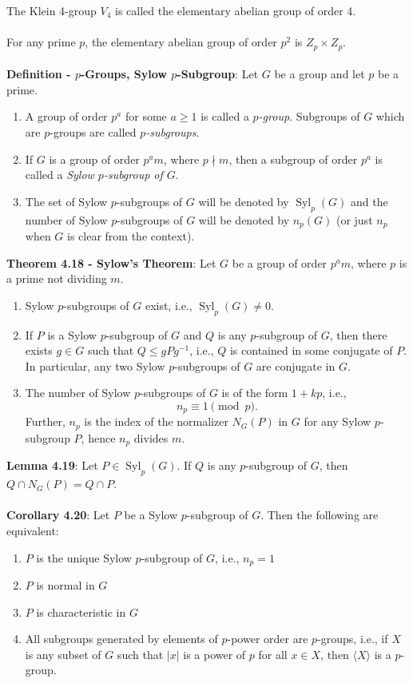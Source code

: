 \documentclass{article}
\DeclareMathOperator{\syl}{Syl}
\begin{document}
The Klein 4-group $V_4$ is called the elementary abelian group of order 4. \\ \\
For any prime $p$, the elementary abelian group of order $p^2$ is $Z_p \times Z_p.$  \\ \\
\textbf{Definition - $p$-Groups, Sylow $p$-Subgroup}: Let $G$ be a group and let $p$ be a prime. \begin{enumerate}
    \item A group of order $p^a$ for some $a \geq 1$ is called a \textit{$p$-group}. Subgroups of $G$ which are $p$-groups are called \textit{$p$-subgroups}.
    \item If $G$ is a group of order $p^am$, where $p \nmid m$, then a subgroup of order $p^a$ is called a \textit{Sylow $p$-subgroup of $G$}.
    \item The set of Sylow $p$-subgroups of $G$ will be denoted by $\syl_p(G)$ and the number of Sylow $p$-subgroups of $G$ will be denoted by $n_p(G)$ (or just $n_p$ when $G$ is clear from the context).
\end{enumerate} $ $ \\
\textbf{Theorem 4.18 - Sylow's Theorem}: Let $G$ be a group of order $p^am$, where $p$ is a prime not dividing $m$. \begin{enumerate}
    \item Sylow $p$-subgroups of $G$ exist, i.e., $\syl_p(G) \neq 0$.
    \item If $P$ is a Sylow $p$-subgroup of $G$ and $Q$ is any $p$-subgroup of $G$, then there exists $g \in G$ such that $Q \leq gPg^{-1}$, i.e., $Q$ is contained in some conjugate of $P$. In particular, any two Sylow $p$-subgroups of $G$ are conjugate in $G$.
    \item  The number of Sylow $p$-subgroups of $G$ is of the form $1 + kp$, i.e., $$n_p \equiv 1 \pmod{p}.$$ Further, $n_p$ is the index of the normalizer $N_G(P)$ in $G$ for any Sylow $p$-subgroup $P$, hence $n_p$ divides $m$.
\end{enumerate} $ $ \\
\textbf{Lemma 4.19}: Let $P \in \syl_p(G)$. If $Q$ is any $p$-subgroup of $G$, then $Q \cap N_G(P) = Q \cap P$. \\ \\
\textbf{Corollary 4.20}: Let $P$ be a Sylow $p$-subgroup of $G$. Then the following are equivalent: \begin{enumerate}
    \item $P$ is the unique Sylow $p$-subgroup of $G$, i.e., $n_p = 1$
    \item $P$ is normal in $G$
    \item $P$ is characteristic in $G$
    \item All subgroups generated by elements of $p$-power order are $p$-groups, i.e., if $X$ is any subset of $G$ such that $|x|$ is a power of $p$ for all $x \in X$, then $\langle X \rangle$ is a $p$-group. 
\end{enumerate} $ $ \\
\end{document}
